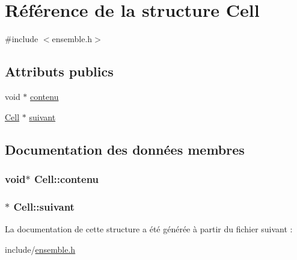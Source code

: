 \hypertarget{structCell}{\section{\-Référence de la structure \-Cell}
\label{structCell}
}


{\ttfamily \#include $<$ensemble.\-h$>$}

\subsection*{\-Attributs publics}
\begin{DoxyCompactItemize}
\item 
void $\ast$ \hyperlink{structCell_af2d81fa8eccad6f58d37802fc1908a61}{contenu}
\item 
\hyperlink{structCell}{\-Cell} $\ast$ \hyperlink{structCell_ad7eff379c5dfaefcb19f09638109dbaf}{suivant}
\end{DoxyCompactItemize}


\subsection{\-Documentation des données membres}
\hypertarget{structCell_af2d81fa8eccad6f58d37802fc1908a61}{
\subsubsection[{contenu}]{\setlength{\rightskip}{0pt plus 5cm}void$\ast$ {\bf \-Cell\-::contenu}}}\label{structCell_af2d81fa8eccad6f58d37802fc1908a61}
\hypertarget{structCell_ad7eff379c5dfaefcb19f09638109dbaf}{
\subsubsection[{suivant}]{$\ast$ {\bf \-Cell\-::suivant}}}\label{structCell_ad7eff379c5dfaefcb19f09638109dbaf}


\-La documentation de cette structure a été générée à partir du fichier suivant \-:\begin{DoxyCompactItemize}
\item 
include/\hyperlink{ensemble_8h}{ensemble.\-h}\end{DoxyCompactItemize}
